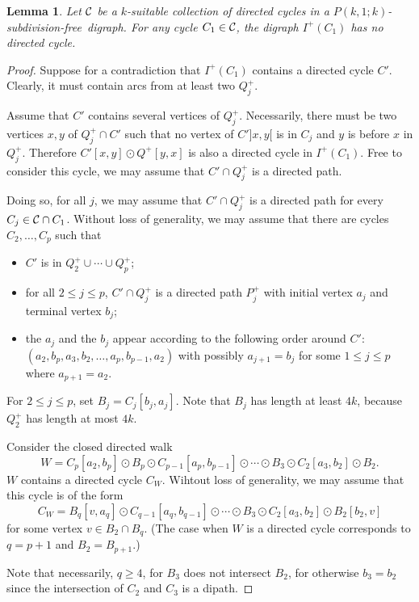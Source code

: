 \documentclass[utf8,10pt]{article}
\theoremstyle{plain}
\newtheorem{lemma}[theorem]{Lemma}
\theoremstyle{definition}
\theoremstyle{remark}
\newcommand{\free}{subdivision-free}
\begin{document}
\begin{lemma}\label{lem:no-dicycle}
Let ${\cal C}$ be a $k$-suitable collection of directed cycles in a $P(k,1;k)$-\free\ digraph. For any cycle $C_1\in {\cal C}$, the digraph
$I^+(C_1)$ has no directed cycle.  
\end{lemma}
\begin{proof}

Suppose for a contradiction that $I^+(C_1)$  contains a directed cycle $C'$.
Clearly, it must contain arcs from at least two $Q^+_j$.



Assume that $C'$ contains several vertices of $Q^+_j$.
Necessarily, there must be two vertices $x,y$ of $Q^+_j\cap C'$ such that no vertex of $C']x,y[$ is in $C_j$ and  $y$ is before $x$ in $Q^+_j$.
Therefore $C'[x,y]\odot Q^+[y,x]$ is also a directed cycle in $I^+(C_1)$. Free to consider this cycle,
we may assume that $C'\cap Q^+_j$ is a directed path.

Doing so, for all $j$, we may assume that $C'\cap Q^+_j$ is a directed path  for every $C_j\in {\cal C}\cap C_1$.
Without loss of generality, we may assume that there are cycles $C_2, \dots , C_p$ such that
\begin{itemize}
\item $C'$ is in $Q^+_2\cup \cdots  \cup Q^+_p$;
\item for all $2\leq j\leq p$, $C'\cap Q^+_j$ is a directed path $P^+_j$ with initial vertex $a_j$ and terminal vertex $b_j$;
\item the $a_j$ and the $b_j$ appear according to the following order around $C'$: $(a_2, b_p, a_3, b_2, \dots ,   a_p, b_{p-1}, a_2)$ with possibly $a_{j+1}=b_j$ for some $1\leq j \leq p$ where $a_{p+1}=a_2$.
\end{itemize}
For $2\leq j\leq p$, set $B_j=C_j[b_j, a_j]$. Note that $B_j$ has length at least $4k$, because $Q^+_2$ has length at most $4k$.


Consider the closed directed walk $$W=C_p[a_2,b_p]\odot B_p \odot C_{p-1}[a_p, b_{p-1}] \odot  \cdots  \odot  B_3\odot C_2[a_3, b_2]\odot B_2.$$
$W$ contains a directed cycle $C_W$. Wihtout loss of generality, we may assume that this cycle is of the form
$$C_W=B_q[v, a_q] \odot C_{q-1}[a_q, b_{q-1}] \odot  \cdots  \odot  B_3\odot C_2[a_3, b_2]\odot B_2[b_2, v]$$
for some vertex $v\in B_2\cap B_q$. (The case when $W$ is a directed cycle corresponds to $q=p+1$ and $B_2=B_{p+1}$.)

Note that necessarily, $q\geq 4$, for $B_3$ does not intersect $B_2$, for otherwise $b_3=b_2$ since the intersection of $C_2$ and $C_3$ is a dipath.


\end{proof}
\end{document}
